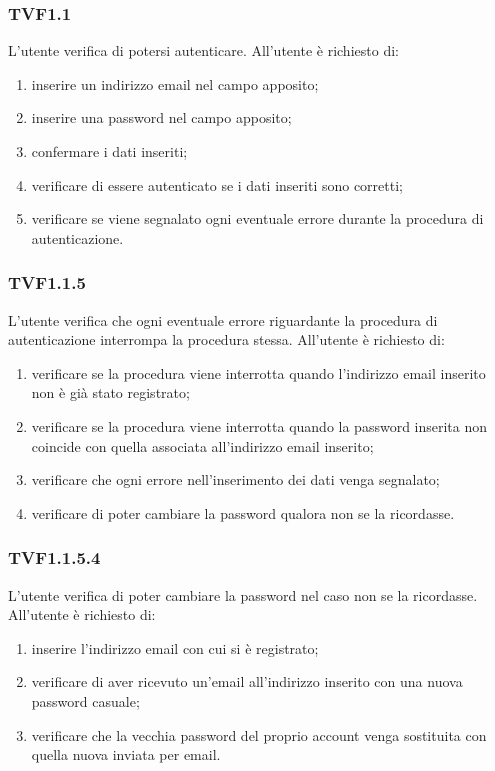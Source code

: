		\subsubsection{TVF1.1}
			L'utente verifica di potersi autenticare. All'utente è richiesto di:
			\begin{enumerate}
				\item inserire un indirizzo email nel campo apposito;
				\item inserire una password nel campo apposito;
				\item confermare i dati inseriti;
				\item verificare di essere autenticato se i dati inseriti sono corretti;
				\item verificare se viene segnalato ogni eventuale errore durante la procedura di autenticazione. 
			\end{enumerate}
		\subsubsection{TVF1.1.5}
			L'utente verifica che ogni eventuale errore riguardante la procedura di autenticazione interrompa la procedura stessa.
			All'utente è richiesto di:
			\begin{enumerate}
				\item verificare se la procedura viene interrotta quando l'indirizzo email inserito non è già stato registrato;
				\item verificare se la procedura viene interrotta quando la password inserita non coincide con quella associata all'indirizzo email inserito;
				\item verificare che ogni errore nell'inserimento dei dati venga segnalato;
				\item verificare di poter cambiare la password qualora non se la ricordasse. 
			\end{enumerate}
		\subsubsection{TVF1.1.5.4}
			L'utente verifica di poter cambiare la password nel caso non se la ricordasse.
			All'utente è richiesto di:
			\begin{enumerate}
				\item inserire l'indirizzo email con cui si è registrato;
				\item verificare di aver ricevuto un'email all'indirizzo inserito con una nuova password casuale;
				\item verificare che la vecchia password del proprio account venga sostituita con quella nuova inviata per email. 
			\end{enumerate}
